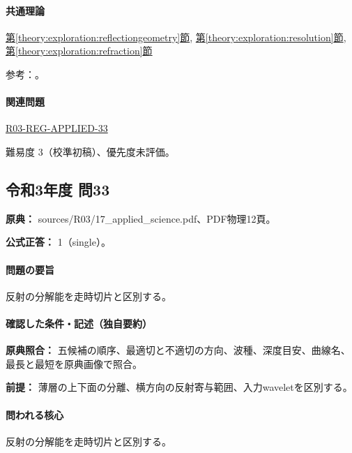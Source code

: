 \paragraph{共通理論} \hyperref[theory:exploration:reflectiongeometry]{第\ref*{theory:exploration:reflectiongeometry}節}, \hyperref[theory:exploration:resolution]{第\ref*{theory:exploration:resolution}節}, \hyperref[theory:exploration:refraction]{第\ref*{theory:exploration:refraction}節}

\par 参考：\cite{jica_refraction2015,usgs_refraction2013,epa_surfacewaves,xia_rayleigh1999,coastal_reflection2016,seg_vertical_resolution,usgs_processing2000}。

\paragraph{関連問題} \hyperref[q:r03-reg-applied-33]{R03-REG-APPLIED-33}

\par 難易度 3（校準初稿）、優先度未評価。

\subsection{令和3年度 問33}
\label{q:r03-reg-applied-33}

\noindent\textbf{原典：} sources/R03/17\_applied\_science.pdf、PDF物理12頁。

\textbf{公式正答：} 1（single）。

\paragraph{問題の要旨} 反射の分解能を走時切片と区別する。

\paragraph{確認した条件・記述（独自要約）}\mbox{}\par

\noindent\textbf{原典照合：} 五候補の順序、最適切と不適切の方向、波種、深度目安、曲線名、最長と最短を原典画像で照合。\par

\noindent\textbf{前提：} 薄層の上下面の分離、横方向の反射寄与範囲、入力waveletを区別する。\par

\paragraph{問われる核心} 反射の分解能を走時切片と区別する。

